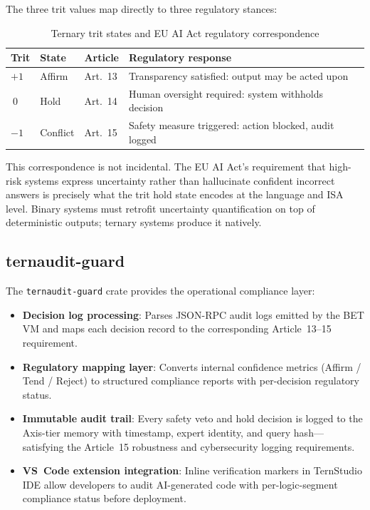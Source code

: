 \documentclass[journal,10pt,twocolumn]{IEEEtran}
\begin{document}
The three trit values map directly to three regulatory stances:

\begin{table}[h]
\centering
\small
\caption{Ternary trit states and EU AI Act regulatory correspondence}
\label{tab:euaiact}
\begin{tabular}{p{1.0cm}p{1.4cm}p{1.3cm}p{3.4cm}}
\toprule
Trit & State & Article & Regulatory response \\
\midrule
$+1$ & Affirm & Art.~13 & Transparency satisfied: output may be acted upon \\
$\ 0$ & Hold & Art.~14 & Human oversight required: system withholds decision \\
$-1$ & Conflict & Art.~15 & Safety measure triggered: action blocked, audit logged \\
\bottomrule
\end{tabular}
\end{table}

This correspondence is not incidental. The EU AI Act's requirement that
high-risk systems express uncertainty rather than hallucinate confident
incorrect answers is precisely what the trit hold state encodes at the
language and ISA level. Binary systems must retrofit uncertainty
quantification on top of deterministic outputs; ternary systems produce
it natively.

\subsection{ternaudit-guard}

The \texttt{ternaudit-guard} crate provides the operational compliance layer:

\begin{itemize}
  \item \textbf{Decision log processing}: Parses JSON-RPC audit logs emitted
        by the BET VM and maps each decision record to the corresponding
        Article~13--15 requirement.
  \item \textbf{Regulatory mapping layer}: Converts internal confidence
        metrics (Affirm / Tend / Reject) to structured compliance reports
        with per-decision regulatory status.
  \item \textbf{Immutable audit trail}: Every safety veto and hold decision
        is logged to the Axis-tier memory with timestamp, expert identity,
        and query hash---satisfying the Article~15 robustness and
        cybersecurity logging requirements.
  \item \textbf{VS~Code extension integration}: Inline verification markers
        in TernStudio IDE allow developers to audit AI-generated code with
        per-logic-segment compliance status before deployment.
\end{itemize}
\end{document}
